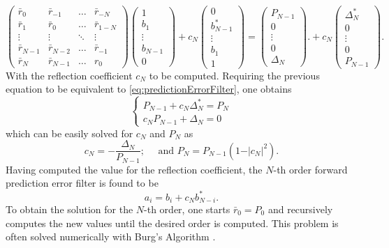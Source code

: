 \documentclass[twocolumn,showpacs,preprintnumbers,nofootinbib,prd,
superscriptaddress,10pt]{revtex4-1}
\begin{document}
\begin{equation}\nonumber 
        \begin{pmatrix}
    \bar r_0 & \bar r_{-1} & \dots & \bar r_{- N}\\
    \bar r_{1} & \bar r_0 & \dots & \bar r_{1 - N}\\ 
    \vdots & \vdots & \ddots & \vdots \\ 
    \bar r_{N -1} & \bar r_{N-2} & \dots &  \bar r_{-1}
    \\
    \bar r_{N } & \bar r_{N -1} & \dots  & r_0 
    \end{pmatrix} 
    \begin{pmatrix}
    1  \\   b_1  \\  \vdots \\   b_{N - 1} \\ 0 
    \end{pmatrix} 
    + c_N 
    \begin{pmatrix}
    0 \\ b^*_{N -1} \\ \vdots  \\ b_1 \\ 1 
    \end{pmatrix}
    =
    \begin{pmatrix}
    P_{N -1} \\  0 \\ \vdots \\ 0 \\ \Delta_N
    \end{pmatrix} .
    + c_N
    \begin{pmatrix}
    \Delta^*_N \\ 0 \\\vdots \\ 0 \\ P_{N-1}
    \end{pmatrix}.
\end{equation}
With the reflection coefficient $c_N$ to be computed. Requiring the previous equation to be equivalent to \ref{eq:predictionErrorFilter}, one obtains
\begin{equation}\nonumber 
\begin{cases}
    P_{N - 1} + c_N\Delta^*_N = P_N \\
    c_N P_{N - 1} + \Delta_N = 0
\end{cases}
\end{equation}
which can be easily solved for $c_N$ and $P_N$ as 
\begin{equation}
    c_N = -\frac{\Delta_N}{P_{N-1}}; \quad \text{ and } P_N = P_{N - 1}\left(1 - \vert c_N \vert ^2 \right). 
\end{equation}
Having computed the value for the reflection coefficient, the $N$-th order forward prediction error filter is found to be 
\begin{equation}
    a_i = b_i + c_N b^*_{N - i}.
\end{equation}
To obtain the solution for the $N$-th order, one starts $\bar r_0 = P_0$ and recursively computes the new values until the desired order is computed. 
This problem is often solved numerically with Burg's Algorithm \cite{Vos}.


	
	
\end{document}
